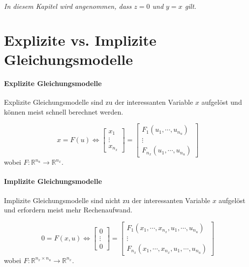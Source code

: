 \documentclass[a4paper, 11pt, accentcolor = tud3b]{tudreport}
\begin{document}
	        
	        \textit{In diesem Kapitel wird angenommen, dass \( z = 0 \) und \( y = x \) gilt.}

        \section{Explizite vs. Implizite Gleichungsmodelle} %
            \paragraph{Explizite Gleichungsmodelle}
	            Explizite Gleichungsmodelle sind zu der interessanten Variable \( x \) aufgelöst und können meist schnell berechnet werden.
            
	            \begin{equation*}
		            x = F(u) \iff
			            \begin{bmatrix}
				            x _ 1 \\
				            \vdots \\
				            x _ { n _ x }
			            \end{bmatrix}
			        =
				        \begin{bmatrix}
					        F _ 1 (u _ 1, \cdots, u _ { n _ u }) \\
					        \vdots \\
					        F _ { n _ x } (u _ 1, \cdots, u _ { n _ u })
				        \end{bmatrix}
	            \end{equation*}
	            wobei \( F : \mathbb{R} ^ { n _ u } \rightarrow \mathbb{R} ^ { n _ x } \).
            
            \paragraph{Implizite Gleichungsmodelle}
	            Implizite Gleichungsmodelle sind nicht zu der interessanten Variable \( x \) aufgelöst und erfordern meist mehr Rechenaufwand.
            
	            \begin{equation*}
		            0 = F(x, u) \iff
			            \begin{bmatrix}
				            0 \\
				            \vdots \\
				            0
			            \end{bmatrix}
		            =
			            \begin{bmatrix}
				            F _ 1 (x _ 1, \cdots, x _ { n _ x }, u _ 1, \cdots, u _ { n _ u }) \\
				            \vdots \\
				            F _ { n _ x } (x _ 1, \cdots, x _ { n _ x }, u _ 1, \cdots, u _ { n _ u })
			            \end{bmatrix}
	            \end{equation*}
	            wobei \( F : \mathbb{R} ^ { n _ x \times n _ u } \rightarrow \mathbb{R} ^ { n _ x } \).
\end{document}
